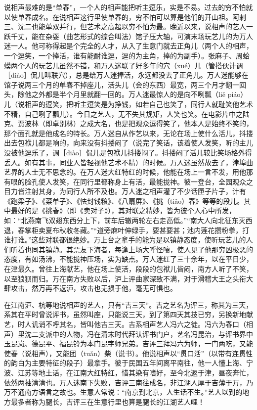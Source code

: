 \documentclass[12pt,UTF8]{ctexbook}
\begin{document}
说相声最难的是“单春”，一个人的相声能把听主逗乐，实是不易。过去的穷不怕就以使单春成名。在说相声这行里使单春的，穷不怕可以算是他们的开山祖。阿剌三、沈二也能单双并行，但艺术之高超以穷不怕为最。晚近以来，说相声的艺人一跃千丈，能在杂耍（曲艺形式的综合叫法）馆子压大轴，可演末场玩艺儿的为万人迷一人。他可称得起是个完全的人才，从入了生意门就去正角儿（两个人的相声，一个逗笑，一个捧活，谁有能耐谁逗，逗的为主角，捧的为副手）。张麻子、周蛤蟆两个人的玩艺儿虽然不错，和万人迷联了好多年的穴（xué）儿（管搭伙计调［diào］侃儿叫联穴），总是给万人迷捧活，永远都没去了正角儿。万人迷能够在馆子说两三个月的单春不掉座儿，活头儿（会的东西）最宽，两三个月才翻一回头，除他之外都是半个月里就翻一回的。万人迷最惊人的是向不咧瓢（liě piáo）儿（说相声的逗笑，把听主逗笑是为挣钱，如若自己也笑了，同行人就耻笑他艺术不精，自己咧了瓢儿）。今日之艺人，无不失其规矩，人笑也笑。在电影片中之陆克、贾波林（即卓别林）之成大名，也是把观众逗得笑了，他本人是始终不笑的，那个面孔就是他成名的特长。万人迷自从作艺以来，无论在场上使什么活儿，抖搂出去包袱儿都是响的，向来没有抖搂闷了（说完了笑话，该着使人发笑，听的主儿没被他逗乐了，调［diào］侃儿是包袱儿抖搂闷了。抖搂闷了活儿较比笑场格外得丢人。如有其事，同业人皆轻视他艺术不精）的时候。万人迷虽然故去了，津埠曲艺界的人士无不思念的。在万人迷大红特红的时候，他能在场上一言不发，用他那有哏的脸孔使人发笑，在同行里都称身上有活，最能拢神。彼一登台，全园观众之目力皆注射其身，为同行人所不及也。万人迷之相声灌了不少话匣子片子，计有《跑梁子》、《菜单子》、《怯封钱粮》、《八扇屏》、《挑（tiǎo）春》等等的段儿。其中最好的是《挑春》（即《卖对子》），其对联之精妙，皆为彼个人心中所发，如：“北燕南飞双翅东西分上下，前车后辙两轮左右走高低。”“南大人向北征东灭西退，春掌柜卖夏布秋收冬藏。”“道旁麻叶伸绿手，要甚要甚；池内莲花攒粉拳，打谁打谁。”这些对联都很绝妙。万上台之拿手的能为是以镇静态度，使听玩艺儿的人们听着也同其镇静。其票友下海者，每逢上场大呼怪嚷，使人见了他那穷凶极恶的态度，有如汤沸，不能拢神压场，实为缺点。万人迷红了三十余年，以在平日少，在津最久。曾往上海献艺，他在场上使活，段段的包袱儿皆闷，南方人听了不笑，以至狼狈而归。万在南方失败以后，沪上评曲家深致不满，对于滑稽大王之头衔大肆攻击，然万再不返沪，攻击也无损于他，毫无可惧也。

在江南沪、杭等地说相声的艺人，只有“吉三天”。吉之艺名为评三，称其为三天，系其在平时曾说评书，虽然叫座，只能说三天，到了第四天其技已穷，另换新地献艺，时人讥诮不呼其名，皆叫他吉三天。吉系相声艺人冯六之徒。冯六为春口（相声）里沈二支派中的人物，冯在清末时代拜认评书门户，艺名冯昆治，与评书界中玉昆岚、德昆平、福昆铃为本门昆字师兄弟。吉评三拜冯六为师，一门两吃，又能使春（说相声），又能团（tuǎn）柴（说书）。他说相声以“贯口活”（以带有连贯性的韵白为主要特征的段子）最拿手。彼于民国五年间离平南往，他一人懂上海、宁波、江苏等地土话，在江南大红特红，惜其染有嗜好，至今北返于津，昼夜奔忙，依然两袖清清也。万人迷南下失败，吉评三南往成名，非江湖人厚于吉薄于万，乃万不通南方语言之故也。生意人常说：“南京到北京，人生话不生。”艺人以到的地方最多者称为腿长，吉评三在生意行里也算是腿长的江湖艺人哩！
\end{document}
